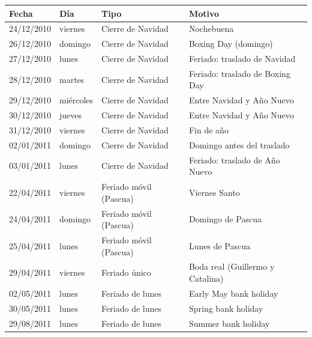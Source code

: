 \begin{tabular}{llll}
\toprule
Fecha & Día & Tipo & Motivo \\
\midrule
24/12/2010 & viernes & Cierre de Navidad & Nochebuena \\
26/12/2010 & domingo & Cierre de Navidad & Boxing Day (domingo) \\
27/12/2010 & lunes & Cierre de Navidad & Feriado: traslado de Navidad \\
28/12/2010 & martes & Cierre de Navidad & Feriado: traslado de Boxing Day \\
29/12/2010 & miércoles & Cierre de Navidad & Entre Navidad y Año Nuevo \\
30/12/2010 & jueves & Cierre de Navidad & Entre Navidad y Año Nuevo \\
31/12/2010 & viernes & Cierre de Navidad & Fin de año \\
02/01/2011 & domingo & Cierre de Navidad & Domingo antes del traslado \\
03/01/2011 & lunes & Cierre de Navidad & Feriado: traslado de Año Nuevo \\
22/04/2011 & viernes & Feriado móvil (Pascua) & Viernes Santo \\
24/04/2011 & domingo & Feriado móvil (Pascua) & Domingo de Pascua \\
25/04/2011 & lunes & Feriado móvil (Pascua) & Lunes de Pascua \\
29/04/2011 & viernes & Feriado único & Boda real (Guillermo y Catalina) \\
02/05/2011 & lunes & Feriado de lunes & Early May bank holiday \\
30/05/2011 & lunes & Feriado de lunes & Spring bank holiday \\
29/08/2011 & lunes & Feriado de lunes & Summer bank holiday \\
\bottomrule
\end{tabular}
